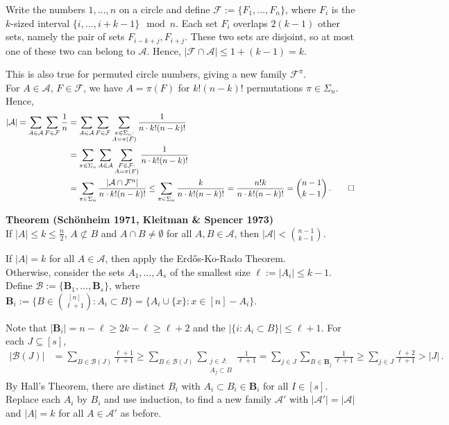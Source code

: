 \documentclass[a4paper]{article}
\let\oldendproof\endproof
\renewenvironment{proof}[1][\proofname]{%
  \oldproof[\scshape \noindent {\bfseries \text{Proof}}]%
}{\oldendproof}
\newenvironment{thm}[1]{
	\begin{framed}
	\noindent
	{\bfseries #1}\\}{\setlength{\itemsep}{0pt}
	\end{framed}
}
\newcommand{\Af}{\mathcal{A}}
\newcommand{\Bb}{\mathbf{B}}
\newcommand{\Bf}{\mathcal{B}}
\newcommand{\Ff}{\mathcal{F}}
\begin{document}
\begin{proof}
Write the numbers $1, \dots, n$ on a circle and define $\Ff := \{F_1, \dots, F_n\}$,
where $F_i$ is the $k$-sized interval $\{i, \dots, i+k-1\}\mod n$.
Each set $F_i$ overlaps $2(k-1)$ other sets,
namely the pair of sets $F_{i-k+j}, F_{i+j}$.
These two sets are  disjoint, so at most one of these two can belong to $\Af$.
Hence, $|\Ff \cap \Af| \leq 1+(k-1) = k$.

This is also true for permuted circle numbers, giving a new family $\Ff^\pi$.\\
For $A \in \Af$, $F \in \Ff$,
we have $A = \pi(F)$ for $k! (n-k)!$ permutations $\pi \in \Sigma_n$. Hence,
\begin{align*}
	 | \Af |
   = \sum_{A \in \Af} \sum_{F \in \Ff} \frac{1}{n}
 & = \sum_{A \in \Af} \sum_{F \in \Ff} \sum_{\substack{\pi \in \Sigma_n:\\ A = \pi(F)}}\frac{1}{n \cdot k!(n-k)!}\\
 & = \sum_{\pi \in \Sigma_n} \sum_{A \in \Af} \sum_{\substack{F \in \Ff:\\ A = \pi(F)}}\frac{1}{n \cdot k!(n-k)!}\\
 & = \sum_{\pi \in \Sigma_n} \frac{|\Af \cap \Ff^n|}{n \cdot k! (n-k)!}
\leq \sum_{\pi \in \Sigma_n} \frac{k}{n \cdot k! (n-k)!}
   = \frac{n! k}{n \cdot k!(n-k)!} = \binom{n-1}{k-1}\,.\qedhere
\end{align*}
\end{proof}


\begin{thm}{Theorem (Sch\"onheim 1971, Kleitman \& Spencer 1973)}
If $|A| \leq k \leq \frac{n}{2}$, $A \not\subset B$
and $A \cap B \neq \emptyset$ for all $A,B \in \Af$, then $|\Af| < \binom{n-1}{k-1}$.
\end{thm}

\begin{proof}
If $|A| = k$ for all $A \in \Af$, then apply the Erd\H{o}s-Ko-Rado Theorem.\\
Otherwise, consider the sets $A_1, \dots, A_s$ of the smallest size $\ell:= |A_i| \leq k-1$.\\
Define $\Bf:= \{\Bb_1, \dots, \Bb_s\}$,
where $\Bb_i := \{ B \in \binom{[n]}{\ell+1} : A_i \subset B\} = \{ A_i \cup \{x\} : x \in [n] - A_i\}$.

Note that $|\Bb_i| = n-\ell \geq 2k-\ell \geq \ell+2$
and the $|\{i : A_i \subset B\}| \leq\ell + 1$.
For each $J \subseteq [s]$,
\begin{align*}
      |\Bf(J)|
  & = \sum_{B \in \Bf(J)} \frac{\ell + 1}{\ell + 1}
    \geq \sum_{B \in \Bf(J)} \sum_{\substack{j \in J:\\ A_j \subset B}} \frac{1}{\ell+1}
    = \sum_{j \in J} \sum_{B \in \Bb_j} \frac{1}{\ell+1}
    \geq \sum_{j \in J} \frac{\ell+2}{\ell+1} > |J|\,.
\end{align*}
By Hall's Theorem, there are distinct $B_i$ with $A_i \subset B_i \in \Bb_i$ for all $I \in[s]$.
Replace each $A_i$ by $B_i$ and use induction,
to find a new family $\Af'$ with $|\Af'| = |\Af|$
and $|A| = k$ for all $A \in \Af'$ as before.
\end{proof}
\end{document}

